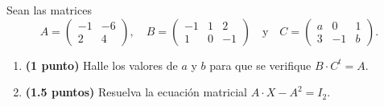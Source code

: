 
Sean las matrices
\[
A=\begin{pmatrix}-1&-6\\2&4\end{pmatrix},\quad
B=\begin{pmatrix}-1&1&2\\1&0&-1\end{pmatrix}\quad\text{y}\quad
C=\begin{pmatrix}a&0&1\\3&-1&b\end{pmatrix}.
\]
\begin{enumerate}[label=\alph*)]
\item \textbf{(1 punto)} Halle los valores de $a$ y $b$ para que se verifique $B\cdot C^t=A$.
\item \textbf{(1.5 puntos)} Resuelva la ecuación matricial $A\cdot X-A^2=I_2$.
\end{enumerate}
